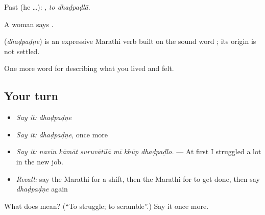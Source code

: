 Past (he …):  , \emph{to dhaḍpaḍlā}.

A woman says .

\begin{cousinweb}
\textbf{} (\emph{dhaḍpaḍṇe}) is an expressive Marathi verb built on the sound word ; its origin is not settled.
\end{cousinweb}

\begin{grammarlens}[title={What you've built}]
One more word for describing what you lived and felt.
\end{grammarlens}

\subsection*{Your turn}
\begin{itemize}
\raggedright
  \item \emph{Say it:} \emph{dhaḍpaḍṇe}
  \item \emph{Say it:} \emph{dhaḍpaḍṇe}, once more
  \item \emph{Say it:} \emph{navīn kāmāt suruvātīlā mī khūp dhaḍpaḍlo.} — At first I struggled a lot in the new job.
  \item \emph{Recall:} say the Marathi for a shift, then the Marathi for to get done, then say \emph{dhaḍpaḍṇe} again
\end{itemize}

\begin{tcolorbox}[breakable,colback=teal!4,colframe=teal!35!black,title={Before you move on}]
What does  mean? (\textquotedblleft{}To struggle; to scramble\textquotedblright{}.) Say it once more.
\end{tcolorbox}
